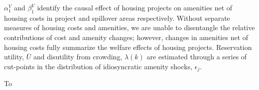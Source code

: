 \documentclass[12pt]{article}
\begin{document}
$\alpha^{V}_1$ and $\beta^{V}_1$ identify the causal effect of housing projects on amenities net of housing costs in project and spillover areas respectively.  Without separate measures of housing costs and amenities, we are unable to disentangle the relative contributions of cost and amenity changes; however, changes in amenities net of housing costs fully summarize the welfare effects of housing projects.  Reservation utility, $\overline{U}$ and disutility from crowding, $\lambda(k)$ are estimated through a series of cut-points in the distribution of idiosyncratic amenity shocks, $\epsilon_j$.  

To 








\end{document}
